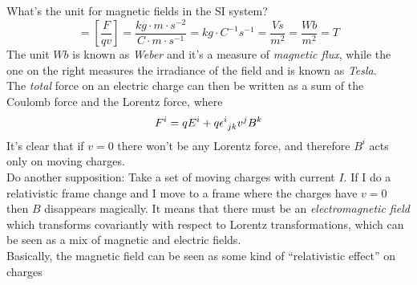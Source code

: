 \documentclass[../electromagnetism]{subfiles}
\begin{document}
What's the unit for magnetic fields in the SI system?
\begin{equation}
	[B]=\left[ \frac{F}{qv} \right]=\unit{\frac{kg\cdot m\cdot s^{-2}}{C\cdot m\cdot s^{-1}}}=\unit{kg\cdot C^{-1}s^{-1}}=\unit{\frac{Vs}{m^2}}=\unit{\frac{Wb}{m^2}}=\unit{T}
	\label{eq:webertesla}
\end{equation}
The unit $\unit{Wb}$ is known as \textit{Weber} and it's a measure of \textit{magnetic flux}, while the one on the right measures the irradiance of the field and is known as \textit{Tesla}.\\
The \textit{total} force on an electric charge can then be written as a sum of the Coulomb force and the Lorentz force, where
\begin{equation}
	F^i=qE^i+q\epsilon^{i}_{\ jk}v^jB^k
	\label{eq:totalforcecharge}
\end{equation}
It's clear that if $v=0$ there won't be any Lorentz force, and therefore $B^i$ acts only on moving charges.\\
Do another supposition: Take a set of moving charges with current $I$. If I do a relativistic frame change and I move to a frame where the charges have $v=0$ then $B$ disappears magically. It means that there must be an \textit{electromagnetic field} which transforms covariantly with respect to Lorentz transformations, which can be seen as a mix of magnetic and electric fields.\\
Basically, the magnetic field can be seen as some kind of ``relativistic effect'' on charges
\end{document}
